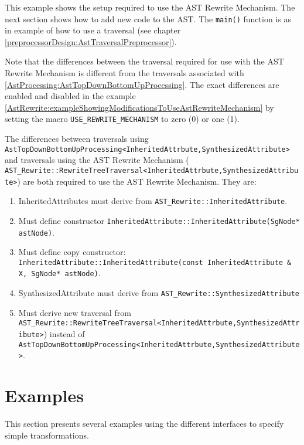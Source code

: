    This example shows the setup required to use the AST Rewrite Mechanism.
The next section shows how to add new code to the AST.  The {\tt main()}
function is as in example of how to use a traversal (see chapter 
\ref{preprocessorDesign:AstTraversalPreprocessor}).

   Note that the differences between the traversal required for use
with the AST Rewrite Mechanism is different from the traversals associated
with \ref{AstProcessing:AstTopDownBottomUpProcessing}.  The exact differences
are enabled and disabled in the example
\ref{AstRewrite:exampleShowingModificationsToUseAstRewriteMechanism}
by setting the macro {\tt USE\_REWRITE\_MECHANISM} to zero (0) or one (1).

   The differences between traversals using
{\tt AstTopDownBottomUpProcessing<InheritedAttrbute,SynthesizedAttribute>}
and traversals using the AST Rewrite Mechanism (
{\tt AST\_Rewrite::RewriteTreeTraversal<InheritedAttrbute,SynthesizedAttribute>})
are both required to use the AST Rewrite Mechanism. They are:
\begin{enumerate}
     \item InheritedAttributes must derive from {\tt AST\_Rewrite::InheritedAttribute}.
     \item Must define constructor {\tt InheritedAttribute::InheritedAttribute(SgNode* astNode)}.
     \item Must define copy constructor: \\
              {\tt InheritedAttribute::InheritedAttribute(const InheritedAttribute \& X, SgNode* astNode)}.
     \item SynthesizedAttribute must derive from {\tt AST\_Rewrite::SynthesizedAttribute}
     \item Must derive new traversal from \\ 
              {\tt AST\_Rewrite::RewriteTreeTraversal<InheritedAttrbute,SynthesizedAttribute>})
           instead of \\
              {\tt AstTopDownBottomUpProcessing<InheritedAttrbute,SynthesizedAttribute>}.
\end{enumerate}


\section{Examples}
    This section presents several examples using the different interfaces
to specify simple transformations.  

